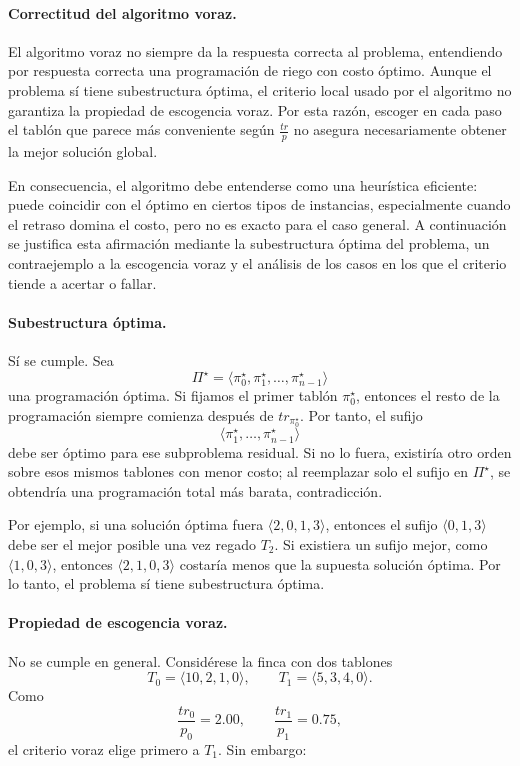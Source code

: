\documentclass[12pt,a4paper]{article}
\begin{document}
\paragraph{Correctitud del algoritmo voraz.}
El algoritmo voraz no siempre da la respuesta correcta al problema, entendiendo por respuesta correcta una programaci\'on de riego con costo \'optimo. Aunque el problema s\'i tiene subestructura \'optima, el criterio local usado por el algoritmo no garantiza la propiedad de escogencia voraz. Por esta raz\'on, escoger en cada paso el tabl\'on que parece m\'as conveniente seg\'un \(\frac{tr}{p}\) no asegura necesariamente obtener la mejor soluci\'on global.

En consecuencia, el algoritmo debe entenderse como una heur\'istica eficiente: puede coincidir con el \'optimo en ciertos tipos de instancias, especialmente cuando el retraso domina el costo, pero no es exacto para el caso general. A continuaci\'on se justifica esta afirmaci\'on mediante la subestructura \'optima del problema, un contraejemplo a la escogencia voraz y el an\'alisis de los casos en los que el criterio tiende a acertar o fallar.

\paragraph{Subestructura \'optima.}
S\'i se cumple. Sea
\[
\Pi^\star=\langle \pi_0^\star,\pi_1^\star,\dots,\pi_{n-1}^\star\rangle
\]
una programaci\'on \'optima. Si fijamos el primer tabl\'on \(\pi_0^\star\), entonces el resto de la programaci\'on siempre comienza despu\'es de \(tr_{\pi_0^\star}\). Por tanto, el sufijo
\[
\langle \pi_1^\star,\dots,\pi_{n-1}^\star\rangle
\]
debe ser \'optimo para ese subproblema residual. Si no lo fuera, existir\'ia otro orden sobre esos mismos tablones con menor costo; al reemplazar solo el sufijo en \(\Pi^\star\), se obtendr\'ia una programaci\'on total m\'as barata, contradicci\'on.

Por ejemplo, si una soluci\'on \'optima fuera \(\langle 2,0,1,3\rangle\), entonces el sufijo \(\langle 0,1,3\rangle\) debe ser el mejor posible una vez regado \(T_2\). Si existiera un sufijo mejor, como \(\langle 1,0,3\rangle\), entonces \(\langle 2,1,0,3\rangle\) costar\'ia menos que la supuesta soluci\'on \'optima. Por lo tanto, el problema s\'i tiene subestructura \'optima.

\paragraph{Propiedad de escogencia voraz.}
No se cumple en general. Consid\'erese la finca con dos tablones
\[
T_0=\langle 10,2,1,0\rangle,\qquad T_1=\langle 5,3,4,0\rangle.
\]
Como
\[
\frac{tr_0}{p_0}=2.00,\qquad \frac{tr_1}{p_1}=0.75,
\]
el criterio voraz elige primero a \(T_1\). Sin embargo:
\end{document}
